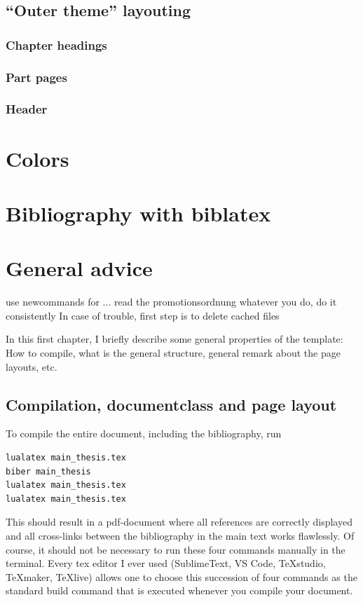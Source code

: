\section{``Outer theme'' layouting}

\subsection{Chapter headings}

\subsection{Part pages}

\subsection{Header}




\chapter{Colors}
\chapter{Bibliography with biblatex}\label{chap:biblatex}

\chapter{General advice}
use newcommands for ...
read the promotionsordnung
whatever you do, do it consistently
In case of trouble, first step is to delete cached files


In this first chapter, I briefly describe some general properties of the template: How to compile, what is the general structure, general remark about the page layouts, etc.

\section{Compilation, documentclass and page layout}

To compile the entire document, including the bibliography, run
\begin{lstlisting}
lualatex main_thesis.tex
biber main_thesis
lualatex main_thesis.tex
lualatex main_thesis.tex
\end{lstlisting}

This should result in a pdf-document where all references are correctly displayed and all cross-links between the bibliography in the main text works flawlessly.
Of course, it should not be necessary to run these four commands manually in the terminal. Every tex editor I ever used (SublimeText, VS Code, TeXstudio, TeXmaker, TeXlive) allows one to choose 
this succession of four commands as the standard build command that is executed whenever you compile your document.


